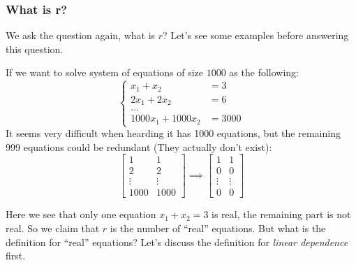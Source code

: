 \subsubsection{What is r?}
We ask the question again, what is $r$? Let's see some examples before answering this question.
\begin{example}
If we want to solve system of equations of size $1000$ as the following:
\[
\left\{\begin{aligned}
x_1+x_2&=3\\2x_1+2x_2&=6\\\dots\\1000x_1+1000x_2&=3000
\end{aligned}\right.
\]
It seems very difficult when hearding it has 1000 equations, but the remaining 999 equations could be redundant (They actually don't exist):
\[
\begin{bmatrix}
1&1\\2&2\\\vdots&\vdots\\1000&1000
\end{bmatrix}\implies
\begin{bmatrix}
1&1\\0&0\\\vdots&\vdots\\0&0
\end{bmatrix}
\]
\end{example}
Here we see that only one equation $x_1+x_2=3$ is real, the remaining part is not real. So we claim that $r$ is the number of ``real'' equations. But what is the definition for ``real'' equations? Let's discuss the definition for \textit{linear dependence} first.
